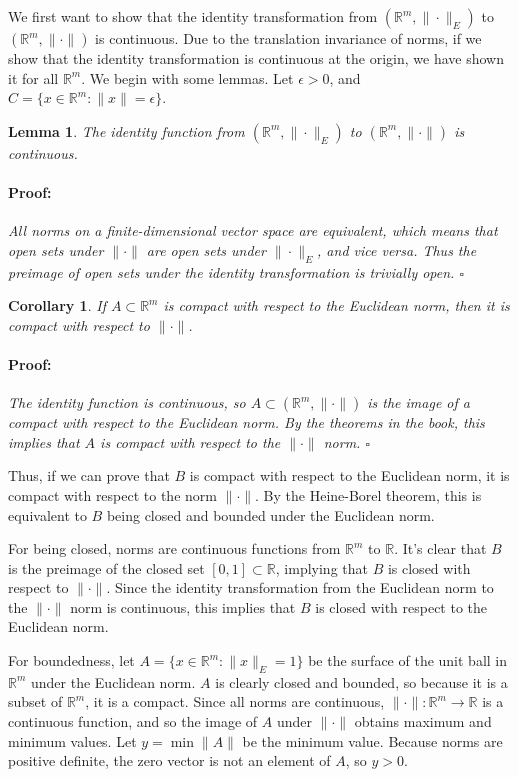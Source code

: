 \documentclass{article}
\newenvironment{proof}{\paragraph{Proof:}}{\hfill$\square$}
\newtheorem{lemma}[theorem]{Lemma}
\newtheorem{corollary}[theorem]{Corollary}
\begin{document}
We first want to show that the identity transformation from $(\mathbb{R}^m, \|\cdot\|_E)$ to $(\mathbb{R}^m, \|\cdot\|)$ is continuous. Due to the translation invariance of norms, if we show that the identity transformation is continuous at the origin, we have shown it for all $\mathbb{R}^m$. We begin with some lemmas. Let $\epsilon > 0$, and $C = \{x \in \mathbb{R}^m: \|x\| = \epsilon\}$.

\begin{lemma}
The identity function from $(\mathbb{R}^m, \|\cdot\|_E)$ to $(\mathbb{R}^m, \|\cdot\|)$ is continuous.
\begin{proof}
All norms on a finite-dimensional vector space are equivalent, which means that open sets under $\|\cdot\|$ are open sets under $\|\cdot\|_E$, and vice versa. Thus the preimage of open sets under the identity transformation is trivially open.
\end{proof}
\end{lemma}

\begin{corollary}
If $A \subset \mathbb{R}^m$ is compact with respect to the Euclidean norm, then it is compact with respect to $\|\cdot\|$.
\begin{proof}
The identity function is continuous, so $A \subset (\mathbb{R}^m, \|\cdot\|)$ is the image of a compact with respect to the Euclidean norm. By the theorems in the book, this implies that $A$ is compact with respect to the $\|\cdot\|$ norm.
\end{proof}
\end{corollary}

Thus, if we can prove that $B$ is compact with respect to the Euclidean norm, it is compact with respect to the norm $\| \cdot \|$. By the Heine-Borel theorem, this is equivalent to $B$ being closed and bounded under the Euclidean norm.

For being closed, norms are continuous functions from $\mathbb{R}^m$ to $\mathbb{R}$. It's clear that $B$ is the preimage of the closed set $[0, 1] \subset \mathbb{R}$, implying that $B$ is closed with respect to $\|\cdot\|$. Since the identity transformation from the Euclidean norm to the $\|\cdot\|$ norm is continuous, this implies that $B$ is closed with respect to the Euclidean norm.

For boundedness, let $A = \{x \in \mathbb{R}^m: \|x\|_E = 1\}$ be the surface of the unit ball in $\mathbb{R}^m$ under the Euclidean norm. $A$ is clearly closed and bounded, so because it is a  subset of $\mathbb{R}^m$, it is a compact. Since all norms are continuous, $\| \cdot \|: \mathbb{R}^m \rightarrow \mathbb{R}$ is a continuous function, and so the image of $A$ under $\| \cdot \|$ obtains maximum and minimum values. Let $y = \min \|A\|$ be the minimum value. Because norms are positive definite, the zero vector is not an element of $A$, so $y > 0$.
\end{document}
